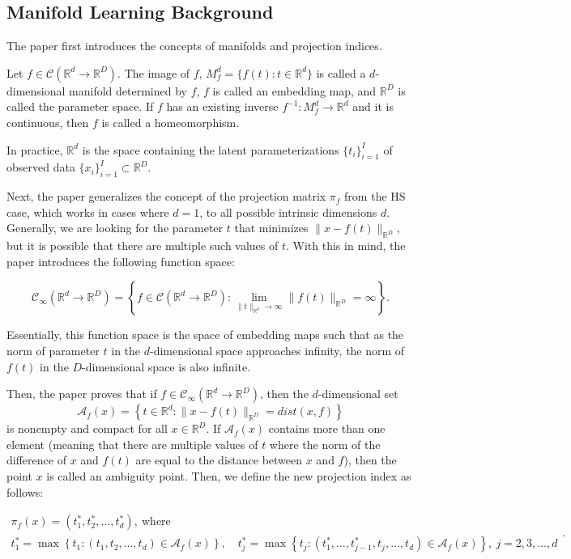 \subsection*{Manifold Learning Background}

The paper first introduces the concepts of manifolds and projection indices.

Let $f \in \mathcal{C}(\mathbb{R}^{d} \to \mathbb{R}^{D})$. The image of $f$, $M_f^{d} = \{f(t): t \in \mathbb{R}^{d}\}$ is called a $d$-dimensional manifold determined by $f$, $f$ is called an embedding map, and $\mathbb{R}^{D}$ is called the parameter space. If $f$ has an existing inverse $f^{-1}: M_f^{d} \to \mathbb{R}^{d}$ and it is continuous, then $f$ is called a homeomorphism.

In practice, $\mathbb{R}^{d}$ is the space containing the latent parameterizations $\{t_i\}_{i=1}^{I}$ of observed data $\{x_i\}_{i=1}^{I} \subset \mathbb{R}^{D}$.

Next, the paper generalizes the concept of the projection matrix $\pi_f$ from the HS case, which works in cases where $d=1$, to all possible intrinsic dimensions $d$. Generally, we are looking for the parameter $t$ that minimizes $\|x - f(t)\|_{\mathbb{R}^{D}}$, but it is possible that there are multiple such values of $t$. With this in mind, the paper introduces the following function space:

\[%
  \mathcal{C}_{\infty}\left(\mathbb{R}^{d} \to \mathbb{R}^{D}\right) = \left\{f \in \mathcal{C}(\mathbb{R}^{d} \to \mathbb{R}^{D}): \lim_{\|t\|_{\mathbb{R}^{d}} \to \infty} \|f(t)\|_{\mathbb{R}^{D}} = \infty \right\}
.\]%

Essentially, this function space is the space of embedding maps such that as the norm of parameter $t$ in the $d$-dimensional space approaches infinity, the norm of $f(t)$ in the $D$-dimensional space is also infinite.

Then, the paper proves that if $f \in \mathcal{C}_{\infty}(\mathbb{R}^{d} \to \mathbb{R}^{D})$, then the $d$-dimensional set 
\[%
  \mathcal{A}_f(x) = \left\{t \in \mathbb{R}^{d}: \|x - f(t)\|_{\mathbb{R}^{D}} = dist(x, f)\right\}
\]%
is nonempty and compact for all $x \in \mathbb{R}^{D}$. If $\mathcal{A}_f(x)$ contains more than one element (meaning that there are multiple values of $t$ where the norm of the difference of $x$ and $f(t)$ are equal to the distance between $x$ and $f$), then the point $x$ is called an ambiguity point. Then, we define the new projection index as follows:

\[%
  \begin{aligned}
    \pi_f(x) = (t_1^{*}, t_2^{*}, \dots, t_d^{*}), \ \text{where} \\
    t_1^{*} = \max \left\{t_1: (t_1, t_2, \dots, t_d) \in \mathcal{A}_f(x)\right\}, \quad t_j^{*} = \max \left\{t_j: (t_1^{*}, \dots, t_{j-1}^{*}, t_j, \dots, t_d) \in \mathcal{A}_f(x)\right\}, \ j = 2, 3, \dots, d
  \end{aligned}
.\]%

